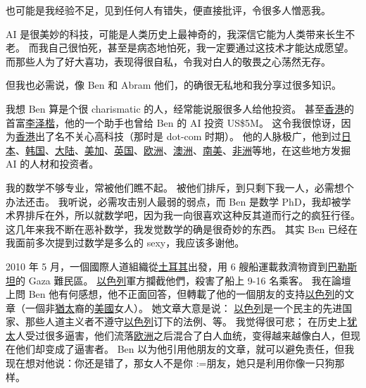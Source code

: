 \documentclass[12pt]{report}
\makeatletter
\renewcommand{\d}[1]{$\underaccent{\scalebox{0.5}{\textbullet}}{\textrm{#1}}$}
\newcommand{\ds}[1]{%
  \@tfor\next:=#1\do{\d{\next}}}
\makeatother
\begin{document}
也可能是我经验不足，见到任何人有错失，便直接批评，令很多人憎恶我。  

AI 是很美妙的科技，可能是人类历史上最神奇的，我深信它能为人类带来长生不老。 而我自己很怕死，甚至是病态地怕死，我一定要通过这技术才能达成愿望。 而那些人为了好大喜功，表现得很自私，令我对白人的敬畏之心荡然无存。

但我也必需说，像 Ben 和 Abram 他们，的确很无私地和我分享过很多知识。

我想 Ben 算是个很 charismatic 的人，经常能说服很多人给他投资。 甚至\underline{香港}的首富\underline{李泽楷}，他的一个助手也曾给 Ben 的 AI 投资 US\$5M。  这令我很惊讶，因为\underline{香港}出了名不关心高科技（那时是 dot-com 时期）。 他的人脉极广，他到过\underline{日本}、\underline{韩国}、\underline{大陆}、\underline{美加}、\underline{英国}、\underline{欧洲}、\underline{澳洲}、\underline{南美}、\underline{非洲}等地，在这些地方发掘 AI 的人材和投资者。

我的数学不够专业，常被他们瞧不起。 被他们排斥，到只剩下我一人，必需想个办法还击。 我听说，必需攻击别人最弱的弱点，而 Ben 是数学 PhD，我却被学术界排斥在外，所以就数学吧，因为我一向很喜欢这种反其道而行之的疯狂行径。 这几年来我不断在恶补数学，我发觉数学的确是很奇妙的东西。 其实 Ben 已经在我面前多次提到过数学是多么的 sexy，我应该多谢他。

2010 年 5 月，一個國際人道組織從\underline{土耳其}出發，用 6 艘船運載救濟物資到\underline{巴勒斯坦}的 Gaza 難民區。 \underline{以色列}軍方攔截他們，殺害了船上 9-16 名乘客。 我在論壇上問 Ben 他有何感想，他不正面回答，但轉載了他的一個朋友的支持\underline{以色列}的文章（一個非\underline{猶太}裔的\underline{美國}女人）。 她文章大意是说： \underline{以色列}是一个民主的先进国家、那些人道主义者不遵守\underline{以色列}订下的法例、等。 我觉得很可悲； 在历史上\underline{犹太}人受过很多逼害，他们流落\underline{欧洲}之后混合了白人血统，变得越来越像白人，但现在他们却变成了逼害者。 Ben 以为他引用他朋友的文章，就可以避免责任，但我现在想对他说：你还是错了，那女人不是你\ds{朋友}，她只是利用你像一只狗那样。

\end{document}
